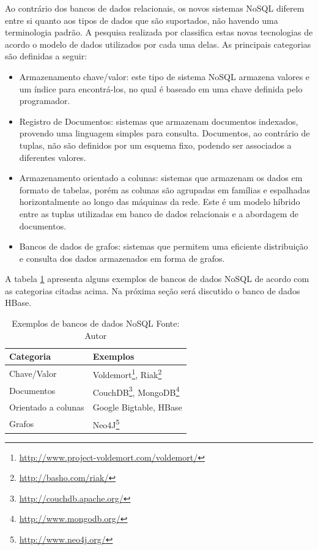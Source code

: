 Ao contrário dos bancos de dados relacionais, os novos sistemas NoSQL diferem entre si quanto aos tipos de dados que são suportados, não havendo uma terminologia padrão. A pesquisa realizada por  classifica estas novas tecnologias de acordo o modelo de dados utilizados por cada uma delas. As principais categorias são definidas a seguir:

\begin{itemize}

  \item{Armazenamento chave/valor: este tipo de sistema NoSQL armazena valores e um índice para encontrá-los, no qual é baseado em uma chave definida pelo programador.}
  \item{Registro de Documentos: sistemas que armazenam documentos indexados, provendo uma linguagem simples para consulta. Documentos, ao contrário de tuplas, não são definidos por um esquema fixo, podendo ser associados a diferentes valores.}
  \item{Armazenamento orientado a colunas: sistemas que armazenam os dados em formato de tabelas, porém as colunas são agrupadas em famílias e espalhadas horizontalmente ao longo das máquinas da rede. Este é um modelo híbrido entre as tuplas utilizadas em banco de dados relacionais e a abordagem de documentos.}
  \item{Bancos de dados de grafos: sistemas que permitem uma eficiente distribuição e consulta dos dados armazenados em forma de grafos.}

\end{itemize}

A tabela \ref{tab-nosql} apresenta alguns exemplos de bancos de dados NoSQL de acordo com as categorias citadas acima. Na próxima seção será discutido o banco de dados HBase.

\begin{savenotes}
\begin{table}[!ht]
\begin{center}
  \begin{tabular}{|p{5cm}|p{3cm}|}
	\hline
	Categoria & Exemplos
	\\ \hline
	Chave/Valor & Voldemort\footnote{\url{http://www.project-voldemort.com/voldemort/}}, Riak\footnote{\url{http://basho.com/riak/}}
	\\ \hline
	Documentos & CouchDB\footnote{\url{http://couchdb.apache.org/}}, MongoDB\footnote{\url{http://www.mongodb.org/}}
	\\ \hline
	Orientado a colunas & Google Bigtable, HBase
	\\ \hline
	Grafos & Neo4J\footnote{\url{http://www.neo4j.org/}}
	\\ \hline
  \end{tabular}
  \captionsetup{justification=centering}
  \caption[Exemplos de bancos de dados NoSQL]{Exemplos de bancos de dados NoSQL
  \protect\linebreak Fonte: Autor}
\label{tab-nosql}
\end{center}
\end{table}
\end{savenotes}
\FloatBarrier

